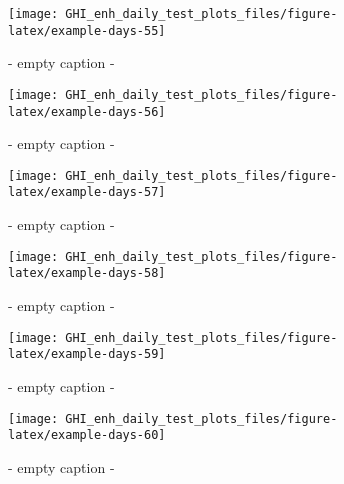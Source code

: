 \documentclass[
  10pt,
  a4paper,oneside]{article}
\begin{document}
\begin{figure}[H]

{\centering \texttt{[image: GHI\_enh\_daily\_test\_plots\_files/figure-latex/example-days-55]} 

}

\caption{ - empty caption - }\label{fig:example-days-55}
\end{figure}

\begin{figure}[H]

{\centering \texttt{[image: GHI\_enh\_daily\_test\_plots\_files/figure-latex/example-days-56]} 

}

\caption{ - empty caption - }\label{fig:example-days-56}
\end{figure}

\begin{figure}[H]

{\centering \texttt{[image: GHI\_enh\_daily\_test\_plots\_files/figure-latex/example-days-57]} 

}

\caption{ - empty caption - }\label{fig:example-days-57}
\end{figure}

\begin{figure}[H]

{\centering \texttt{[image: GHI\_enh\_daily\_test\_plots\_files/figure-latex/example-days-58]} 

}

\caption{ - empty caption - }\label{fig:example-days-58}
\end{figure}

\begin{figure}[H]

{\centering \texttt{[image: GHI\_enh\_daily\_test\_plots\_files/figure-latex/example-days-59]} 

}

\caption{ - empty caption - }\label{fig:example-days-59}
\end{figure}

\begin{figure}[H]

{\centering \texttt{[image: GHI\_enh\_daily\_test\_plots\_files/figure-latex/example-days-60]} 

}

\caption{ - empty caption - }\label{fig:example-days-60}
\end{figure}
\end{document}
